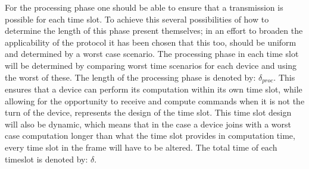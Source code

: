 \bigskip \noindent
For the processing phase one should be able to ensure that a transmission is possible for each time slot.
To achieve this several possibilities of how to determine the length of this phase present themselves; in an effort to broaden the applicability of the protocol it has been chosen that this too, should be uniform and determined by a worst case scenario.
The processing phase in each time slot will be determined by comparing worst time scenarios for each device and using the worst of these.
The length of the processing phase is denoted by: $\delta_{proc}$.
This ensures that a device can perform its computation within its own time slot, while allowing for the opportunity to receive and compute commands when it is not the turn of the device,  represents the design of the time slot.
This time slot design will also be dynamic, which means that in the case a device joins with a worst case computation longer than what the time slot provides in computation time, every time slot in the frame will have to be altered.
The total time of each timeslot is denoted by: $\delta$.

